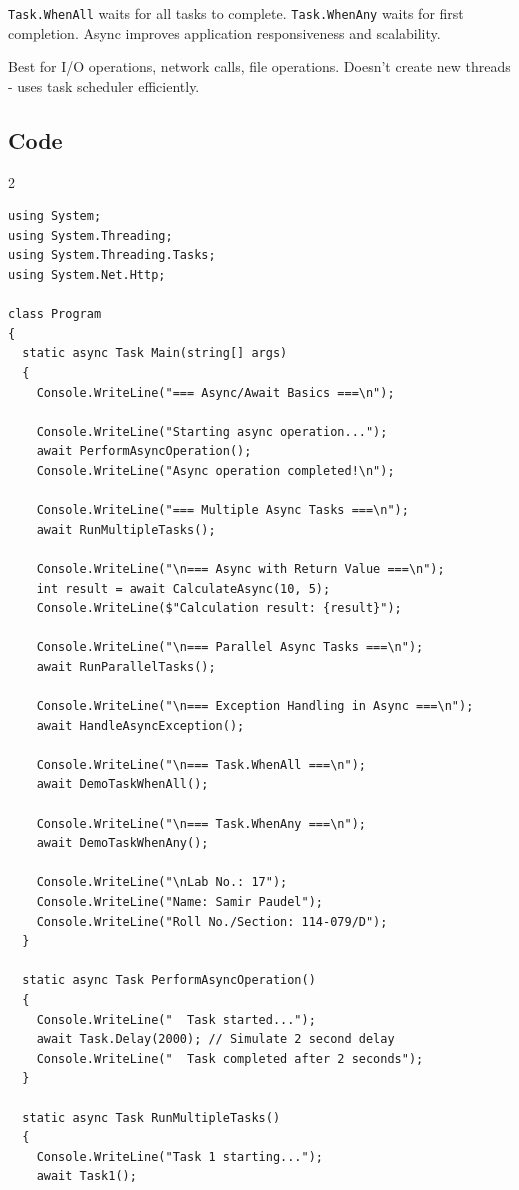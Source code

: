 \documentclass[10pt,a4paper]{article}
\begin{document}
\texttt{Task.WhenAll} waits for all tasks to complete. \texttt{Task.WhenAny} waits for first completion. Async improves application responsiveness and scalability.

Best for I/O operations, network calls, file operations. Doesn't create new threads - uses task scheduler efficiently.

\subsection*{Code}
\begin{multicols}{2}
\begin{lstlisting}
using System;
using System.Threading;
using System.Threading.Tasks;
using System.Net.Http;

class Program
{
  static async Task Main(string[] args)
  {
    Console.WriteLine("=== Async/Await Basics ===\n");
    
    Console.WriteLine("Starting async operation...");
    await PerformAsyncOperation();
    Console.WriteLine("Async operation completed!\n");
    
    Console.WriteLine("=== Multiple Async Tasks ===\n");
    await RunMultipleTasks();
    
    Console.WriteLine("\n=== Async with Return Value ===\n");
    int result = await CalculateAsync(10, 5);
    Console.WriteLine($"Calculation result: {result}");
    
    Console.WriteLine("\n=== Parallel Async Tasks ===\n");
    await RunParallelTasks();
    
    Console.WriteLine("\n=== Exception Handling in Async ===\n");
    await HandleAsyncException();
    
    Console.WriteLine("\n=== Task.WhenAll ===\n");
    await DemoTaskWhenAll();
    
    Console.WriteLine("\n=== Task.WhenAny ===\n");
    await DemoTaskWhenAny();
    
    Console.WriteLine("\nLab No.: 17");
    Console.WriteLine("Name: Samir Paudel");
    Console.WriteLine("Roll No./Section: 114-079/D");
  }
  
  static async Task PerformAsyncOperation()
  {
    Console.WriteLine("  Task started...");
    await Task.Delay(2000); // Simulate 2 second delay
    Console.WriteLine("  Task completed after 2 seconds");
  }
  
  static async Task RunMultipleTasks()
  {
    Console.WriteLine("Task 1 starting...");
    await Task1();
    

\end{lstlisting}
\end{multicols}
\end{document}
